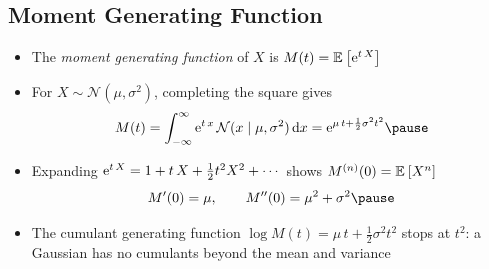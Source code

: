 
\begin{slide}
\section[-2]{Moment Generating Function}

\begin{PauseHighLight}
  \begin{itemize}
  \item The \emph{moment generating function} of $X$ is
    $M(t) = \mathbb{E}_{}\left[ {\rm e}^{t\,X} \right]$\pause
  \item For $X\sim\mathcal{N}(\mu,\sigma^2)$, completing the square gives
    \begin{align*}
      M(t) = \int_{-\infty}^{\infty} \e{t\,x}\,\mathcal{N}(x\mid\mu,\sigma^2)\,\dd x
      = \e{\mu\,t + \frac12\sigma^2 t^2}\pause
    \end{align*}
  \item Expanding ${\rm e}^{t\,X} = 1 + t\,X + \frac{1}{2}t^2X^2 + \cdots$
    shows $M^{(n)}(0) = \mathbb{E}_{}\left[ X^n \right]$\pause
    \begin{align*}
      M'(0) = \mu, \qquad M''(0) = \mu^2+\sigma^2\pause
    \end{align*}
  \item The cumulant generating function $\log M(t) = \mu\,t +
    \frac{1}{2}\sigma^2t^2$ stops at $t^2$: a Gaussian has no
    cumulants beyond the mean and variance\pause
  \end{itemize}
\end{PauseHighLight}

\end{slide}


